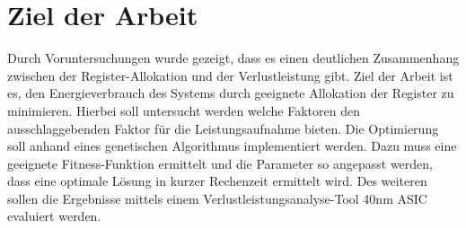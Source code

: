\section{Ziel der Arbeit}
\label{sec:ziele}
Durch Voruntersuchungen wurde gezeigt, dass es einen deutlichen Zusammenhang zwischen der Register-Allokation und der Verlustleistung gibt. Ziel der Arbeit ist es, den Energieverbrauch des Systems durch geeignete Allokation der Register zu minimieren. Hierbei soll untersucht werden welche Faktoren den ausschlaggebenden Faktor für die Leistungsaufnahme bieten. Die Optimierung soll anhand eines genetischen Algorithmus implementiert werden. Dazu muss eine geeignete Fitness-Funktion ermittelt und die Parameter so angepasst werden, dass eine optimale Lösung in kurzer Rechenzeit ermittelt wird. Des weiteren sollen die Ergebnisse mittels einem Verlustleistungsanalyse-Tool 40nm ASIC evaluiert werden.

%

